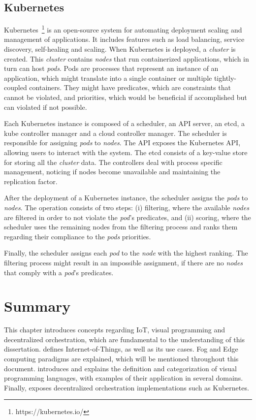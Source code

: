 \subsection{Kubernetes}\label{sec:kubernetes}

Kubernetes~\footnote{https://kubernetes.io/} is an open-source system for automating deployment scaling and management of applications. It includes features such as load balancing, service discovery, self-healing and scaling. When Kubernetes is deployed, a \textit{cluster} is created. This \textit{cluster} contains \textit{nodes} that run containerized applications, which in turn can host \textit{pods}. Pods are processes that represent an instance of an application, which might translate into a single container or multiple tightly-coupled containers. They might have predicates, which are constraints that cannot be violated, and priorities, which would be beneficial if accomplished but can violated if not possible.

Each Kubernetes instance is composed of a scheduler, an API server, an etcd, a kube controller manager and a cloud controller manager. The scheduler is responsible for assigning \textit{pods} to \textit{nodes}. The API exposes the Kubernetes API, allowing users to interact with the system. The etcd consists of a key-value store for storing all the \textit{cluster} data. The controllers deal with process specific management, \ie noticing if nodes become unavailable and maintaining the replication factor.

After the deployment of a Kubernetes instance, the scheduler assigns the \textit{pods} to \textit{nodes}. The operation consists of two steps: (i) filtering, where the available \textit{nodes} are filtered in order to not violate the \textit{pod}'s predicates, and (ii) scoring, where the scheduler uses the remaining nodes from the filtering process and ranks them regarding their compliance to the \textit{pods} priorities. 

Finally, the scheduler assigns each \textit{pod} to the \textit{node} with the highest ranking. The filtering process might result in an impossible assignment, if there are no \textit{nodes} that comply with a \textit{pod}'s predicates. 

\section{Summary}

This chapter introduces concepts regarding IoT, visual programming and decentralized orchestration, which are fundamental to the understanding of this dissertation.  defines Internet-of-Things, as well as its use cases. Fog and Edge computing paradigms are explained, which will be mentioned throughout this document.  introduces and explains the definition and categorization of visual programming languages, with examples of their application in several domains. Finally,  exposes decentralized orchestration implementations such as Kubernetes.
